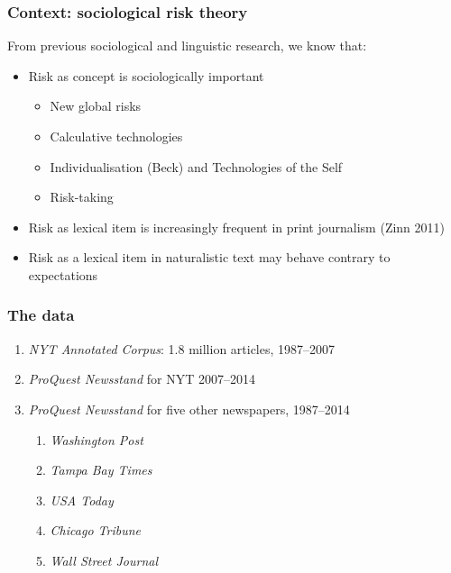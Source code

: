 \documentclass{beamer}       %
\begin{document}
\begin{frame}
    \frametitle{Context: sociological risk theory}
    
    From previous sociological and linguistic research, we know that:

    \begin{itemize}
    \item Risk as concept is sociologically important
    \begin{itemize}
        \item New global risks \cite{beck_risk_1992}
        \item Calculative technologies \cite{dean_governmentality:_1999}
        \item Individualisation (Beck) and Technologies of the Self \cite{dean_risk_1998}
        \item Risk-taking \cite{luhmann_risk:_1993}
    \end{itemize}
    \item Risk as lexical item is increasingly frequent in print journalism (Zinn 2011)
    \item Risk as a lexical item in naturalistic text may behave contrary to expectations \cite{hamilton_meanings_2007}
    \end{itemize}
\end{frame}

\begin{frame}
    \frametitle{The data}

    \begin{enumerate}
        \item \emph{NYT Annotated Corpus}: 1.8 million articles, 1987--2007 \cite{sandhaus_new_2008}
        \item \emph{ProQuest Newsstand} for NYT 2007--2014
        \item \emph{ProQuest Newsstand} for five other newspapers, 1987--2014
        \begin{enumerate}
            \item \emph{Washington Post}
            \item \emph{Tampa Bay Times}
            \item \emph{USA Today}
            \item \emph{Chicago Tribune}
            \item \emph{Wall Street Journal}
        \end{enumerate}
    \end{enumerate}
\end{frame}
\end{document}
